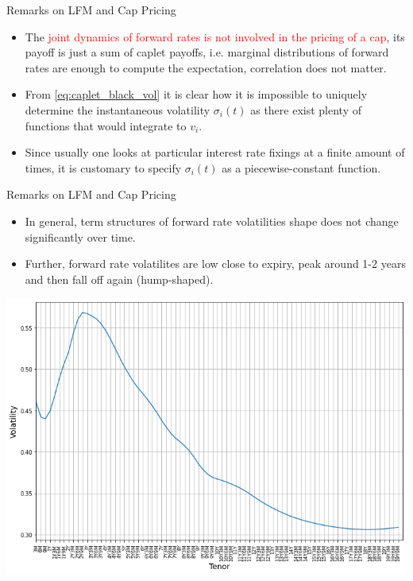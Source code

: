 \documentclass{beamer}
\begin{document}
\begin{frame}{Remarks on LFM and Cap Pricing}
\begin{itemize}
	\item<1-> The \textcolor{red}{joint dynamics of forward rates is not involved in the pricing of a cap}, its payoff is just a sum of caplet payoffs, i.e. marginal distributions of forward rates are enough to compute the expectation, correlation does not matter. 
	\item<2-> From \cref{eq:caplet_black_vol} it is clear how it is impossible to uniquely determine the instantaneous volatility $\sigma_i(t)$ as there exist plenty of functions that would integrate to $v_i$.
	\item<3-> Since usually one looks at particular interest rate fixings at a finite amount of times, it is customary to specify $\sigma_i(t)$ as a piecewise-constant function.
	\end{itemize}
\end{frame}

\begin{frame}{Remarks on LFM and Cap Pricing}
	\begin{itemize}
	\item In general, term structures of forward rate volatilities shape does not change significantly over time. 
	\item Further, forward rate volatilites are low close to expiry, peak around 1-2 years and then fall off again (hump-shaped).
	\end{itemize}
	\begin{center}
		\includegraphics[width=0.5\linewidth]{cap_vola}
	\end{center}
\end{frame}
\end{document}
